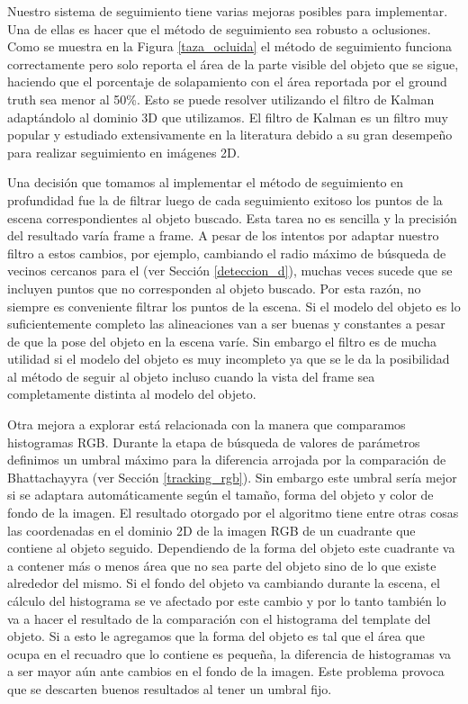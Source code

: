Nuestro sistema de seguimiento tiene varias mejoras posibles para implementar. Una de ellas es hacer que el método de seguimiento sea robusto a oclusiones. Como se muestra en la Figura \ref{taza_ocluida} el método de seguimiento funciona correctamente pero solo reporta el área de la parte visible del objeto que se sigue, haciendo que el porcentaje de solapamiento con el área reportada por el ground truth sea menor al 50\%. Esto se puede resolver utilizando el filtro de Kalman \cite{welch1995introduction} adaptándolo al dominio 3D que utilizamos. El filtro de Kalman es un filtro muy popular y estudiado extensivamente en la literatura \cite{julier1997new,wan2000unscented} debido a su gran desempeño para realizar seguimiento en imágenes 2D.

Una decisión que tomamos al implementar el método de seguimiento en profundidad fue la de filtrar luego de cada seguimiento exitoso los puntos de la escena correspondientes al objeto buscado. Esta tarea no es sencilla y la precisión del resultado varía frame a frame. A pesar de los intentos por adaptar nuestro filtro a estos cambios, por ejemplo, cambiando el radio máximo de búsqueda de vecinos cercanos para el \kdt (ver Sección \ref{deteccion_d}), muchas veces sucede que se incluyen puntos que no corresponden al objeto buscado. Por esta razón, no siempre es conveniente filtrar los puntos de la escena. Si el modelo del objeto es lo suficientemente completo las alineaciones van a ser buenas y constantes a pesar de que la pose del objeto en la escena varíe. Sin embargo el filtro es de mucha utilidad si el modelo del objeto es muy incompleto ya que se le da la posibilidad al método de seguir al objeto incluso cuando la vista del frame sea completamente distinta al modelo del objeto.

Otra mejora a explorar está relacionada con la manera que comparamos histogramas RGB. Durante la etapa de búsqueda de valores de parámetros definimos un umbral máximo para la diferencia arrojada por la comparación de Bhattachayyra (ver Sección \ref{tracking_rgb}). Sin embargo este umbral sería mejor si se adaptara automáticamente según el tamaño, forma del objeto y color de fondo de la imagen. El resultado otorgado por el algoritmo tiene entre otras cosas las coordenadas en el dominio 2D de la imagen RGB de un cuadrante que contiene al objeto seguido. Dependiendo de la forma del objeto este cuadrante va a contener más o menos área que no sea parte del objeto sino de lo que existe alrededor del mismo. Si el fondo del objeto va cambiando durante la escena, el cálculo del histograma se ve afectado por este cambio y por lo tanto también lo va a hacer el resultado de la comparación con el histograma del template del objeto. Si a esto le agregamos que la forma del objeto es tal que el área que ocupa en el recuadro que lo contiene es pequeña, la diferencia de histogramas va a ser mayor aún ante cambios en el fondo de la imagen. Este problema provoca que se descarten buenos resultados al tener un umbral fijo.

